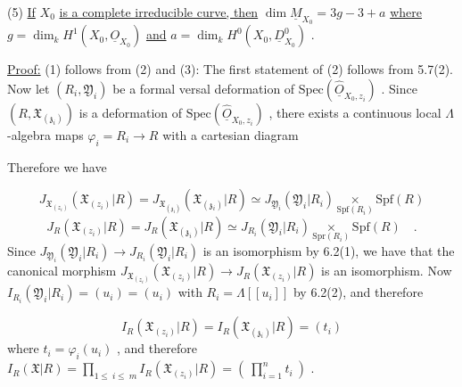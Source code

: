 (5)  \underline{If} $X_0$ \underline{is a complete irreducible curve, then} $\dim \underline{M}_{X_0} = 3g - 3 + a$ \underline{where} $g = \dim_k H^1(X_0, \underline{O}_{X_0})$ \underline{and} $a = \dim_k H^0(X_0, \underline{D}^0_{X_0})$ .

\underline{Proof:}  (1) follows from (2) and (3): The first statement of (2) follows from 5.7(2). Now let $(R_i, \mathfrak{Y}_i)$ be a formal versal deformation of $\mathrm{Spec}(\hat{\underline{O}}_{X_0,z_i})$ . Since $(R, \mathfrak{X}_{(\mathfrak{z}_i)})$ is a deformation of $\mathrm{Spec}(\hat{\underline{O}}_{X_0,z_i})$ , there exists a continuous local $\Lambda$-algebra maps $\varphi_i = R_i \to R$ with a cartesian diagram

\begin{center}
\end{center}
Therefore we have

\begin{equation*}
J_{\mathfrak{X}_{(z_i)}}(\mathfrak{X}_{(z_i)}|R) = J_{\mathfrak{X}_{(\mathfrak{z}_i)}}(\mathfrak{X}_{(\mathfrak{z}_i)}|R) \simeq J_{\mathfrak{Y}_i}(\mathfrak{Y}_i|R_i) \underset{\mathrm{Spf}(R_i)}{\times} \mathrm{Spf}(R)
\end{equation*}
\begin{equation*}
J_R(\mathfrak{X}_{(z_i)}|R) = J_R(\mathfrak{X}_{(\mathfrak{z}_i)}|R) \simeq J_{R_i}(\mathfrak{Y}_i|R_i) \underset{\mathrm{Spr}(R_i)}{\times} \mathrm{Spf}(R) \quad .
\end{equation*}
Since $J_{\mathfrak{Y}_i}(\mathfrak{Y}_i|R_i) \to J_{R_i}(\mathfrak{Y}_i|R_i)$ is an isomorphism by 6.2(1), we have that the canonical morphism $J_{\mathfrak{X}_{(z_i)}}(\mathfrak{X}_{(z_i)}|R) \to J_R(\mathfrak{X}_{(z_i)}|R)$ is an isomorphism. Now $I_{R_i}(\mathfrak{Y}_i|R_i) = (u_i) = (u_i)$ with $R_i = \Lambda[[u_i]]$ by 6.2(2), and therefore

\begin{equation*}
I_R(\mathfrak{X}_{(z_i)}|R) = I_R(\mathfrak{X}_{(\mathfrak{z}_i)}|R) = (t_i)
\end{equation*}
where $t_i = \varphi_i(u_i)$ , and therefore $I_R(\mathfrak{X}|R) = \prod_{1\leq\ i\leq\ m} I_R(\mathfrak{X}_{(z_i)}|R) = (\ \prod_{i=1}^{n} t_i\ )$ .

